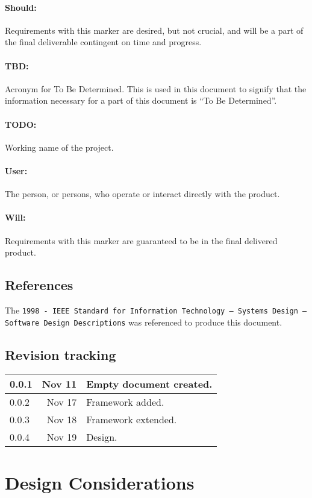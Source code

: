 \documentclass[12pt]{article}
\begin{document}
\paragraph{Should:} Requirements with this marker are desired, but not crucial, and will be a part of the final deliverable contingent on time and progress.
\paragraph{TBD:} Acronym for To Be Determined. This is used in this document to signify that the information necessary for a part of this document is ``To Be Determined''.
\paragraph{TODO:} Working name of the project.
\paragraph{User:} The person, or persons, who operate or interact directly with the product.
\paragraph{Will:} Requirements with this marker are guaranteed to be in the final delivered product.

\subsection{References}
The {\tt 1998 - IEEE Standard for Information Technology -- Systems Design -- Software Design Descriptions} was referenced to produce this document.

\subsection{Revision tracking}
\begin{tabular}{|l|r|p{4.6in}|}
\hline
0.0.1 & Nov 11 & Empty document created.\\
\hline
0.0.2 & Nov 17 & Framework added.\\
\hline
0.0.3 & Nov 18 & Framework extended.\\
\hline
0.0.4 & Nov 19 & Design.\\
\hline
\end{tabular}

\section{Design Considerations}
\end{document}
